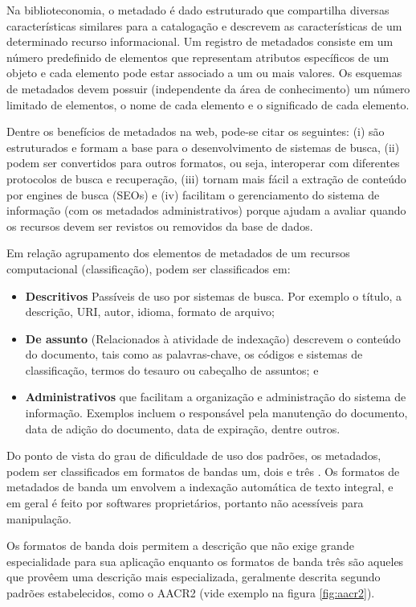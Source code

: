 Na biblioteconomia, o metadado é dado estruturado que compartilha diversas características similares para a catalogação e descrevem as características de um determinado recurso informacional. Um registro de metadados consiste em um número predefinido de elementos que representam atributos específicos de um objeto e cada elemento pode estar associado a um ou mais valores. Os esquemas de metadados devem possuir (independente da área de conhecimento) um número limitado de elementos, o nome de cada elemento e o significado de cada elemento.

Dentre os benefícios de metadados na web, pode-se citar os seguintes: (i) são estruturados e formam a base para o desenvolvimento de sistemas de busca, (ii) podem ser convertidos para outros formatos, ou seja, interoperar com diferentes protocolos de busca e recuperação, (iii) tornam mais fácil a extração de conteúdo por engines de busca (SEOs) e (iv) facilitam o gerenciamento do sistema de informação (com os metadados administrativos) porque ajudam a avaliar quando os recursos devem ser revistos ou removidos da base de dados.

Em relação agrupamento dos elementos de metadados de um recursos computacional (classificação), podem ser classificados em:

\begin{itemize}
	\item \textbf{Descritivos} Passíveis de uso por sistemas de busca. Por exemplo o título, a descrição, URI, autor, idioma, formato de arquivo;
	\item \textbf{De assunto} (Relacionados à atividade de indexação) descrevem o conteúdo do documento, tais como as palavras-chave, os códigos e sistemas de classificação, termos do tesauro ou cabeçalho de assuntos; e
	\item \textbf{Administrativos} que facilitam a organização e administração do sistema de informação. Exemplos incluem o responsável pela manutenção do documento, data de adição do documento, data de expiração, dentre outros.
\end{itemize}

Do ponto de vista do grau de dificuldade de uso dos padrões, os metadados, podem ser classificados em formatos de bandas um, dois e três \cite{feitosa2006organizacao}. Os formatos de metadados de banda um envolvem a indexação automática de texto integral, e em geral é feito por softwares proprietários, portanto não acessíveis para manipulação.

Os formatos de banda dois permitem a descrição que não exige grande especialidade para sua aplicação enquanto os formatos de banda três são aqueles que provêem uma descrição mais especializada, geralmente descrita segundo padrões estabelecidos, como o AACR2 (vide exemplo na figura \ref{fig:aacr2}). 

